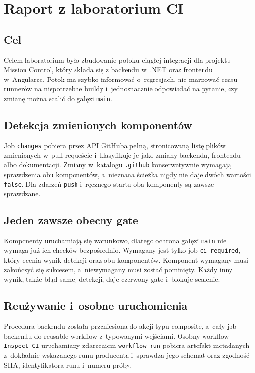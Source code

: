 \documentclass{sprz}
\begin{document}
\tableofcontents

\chapter{Raport z laboratorium CI}

\section{Cel}

Celem laboratorium było zbudowanie potoku ciągłej integracji dla projektu
Mission Control, który składa się z backendu w~.NET oraz frontendu w~Angularze.
Potok ma szybko informować o~regresjach, nie marnować czasu runnerów na
niepotrzebne buildy i~jednoznacznie odpowiadać na pytanie, czy zmianę można
scalić do gałęzi \texttt{main}.

\section{Detekcja zmienionych komponentów}

Job \texttt{changes} pobiera przez API GitHuba pełną, stronicowaną listę plików
zmienionych w~pull requeście i~klasyfikuje je jako zmiany backendu, frontendu
albo dokumentacji. Zmiany w~katalogu \texttt{.github} konserwatywnie wymagają
sprawdzenia obu komponentów, a~nieznana ścieżka nigdy nie daje dwóch wartości
\texttt{false}. Dla zdarzeń \texttt{push} i~ręcznego startu oba komponenty są
zawsze sprawdzane.

\section{Jeden zawsze obecny gate}

Komponenty uruchamiają się warunkowo, dlatego ochrona gałęzi \texttt{main} nie
wymaga już ich checków bezpośrednio. Wymagany jest tylko job
\texttt{ci-required}, który ocenia wynik detekcji oraz obu komponentów.
Komponent wymagany musi zakończyć się sukcesem, a~niewymagany musi zostać
pominięty. Każdy inny wynik, także błąd samej detekcji, daje czerwony gate
i~blokuje scalenie.

\section{Reużywanie i~osobne uruchomienia}

Procedura backendu została przeniesiona do akcji typu composite, a~cały job
backendu do reusable workflow z~typowanymi wejściami. Osobny workflow
\texttt{Inspect CI} uruchamiany zdarzeniem \texttt{workflow\_run} pobiera
artefakt metadanych z~dokładnie wskazanego runu producenta i~sprawdza jego
schemat oraz zgodność SHA, identyfikatora runu i~numeru próby.
\end{document}
